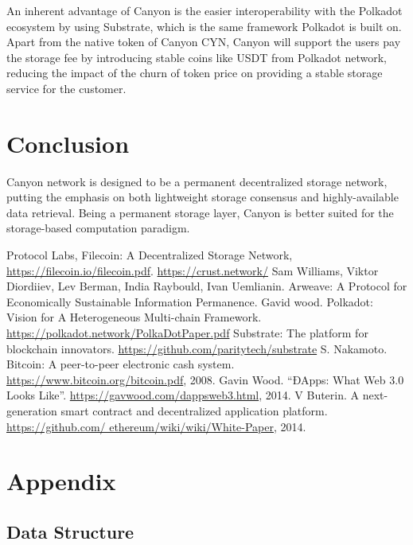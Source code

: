 \documentclass[]{article}
\begin{document}
An inherent advantage of Canyon is the easier interoperability with the Polkadot\cite{ref4} ecosystem by using Substrate\cite{ref5}, which is the same framework Polkadot is built on. Apart from the native token of Canyon CYN, Canyon will support the users pay the storage fee by introducing stable coins like USDT from Polkadot network, reducing the impact of the churn of token price on providing a stable storage service for the customer.

\section{Conclusion}

Canyon network is designed to be a permanent decentralized storage network, putting the emphasis on both lightweight storage consensus and highly-available data retrieval. Being a permanent storage layer, Canyon is better suited for the storage-based computation paradigm.

\begin{thebibliography}{99}
Protocol Labs, Filecoin: A Decentralized Storage Network, \url{https://filecoin.io/filecoin.pdf}.
\url{https://crust.network/}
Sam Williams, Viktor Diordiiev, Lev Berman, India Raybould, Ivan Uemlianin. Arweave: A Protocol for Economically Sustainable Information Permanence.
Gavid wood. Polkadot: Vision for A Heterogeneous Multi-chain Framework. \url{https://polkadot.network/PolkaDotPaper.pdf}
Substrate: The platform for blockchain innovators. \url{https://github.com/paritytech/substrate}
S. Nakamoto. Bitcoin: A peer-to-peer electronic cash system. \url{https://www.bitcoin.org/bitcoin.pdf}, 2008.
Gavin Wood. “ĐApps: What Web 3.0 Looks Like”. \url{https://gavwood.com/dappsweb3.html}, 2014.
V Buterin. A next-generation smart contract and decentralized application platform. \url{https://github.com/
ethereum/wiki/wiki/White-Paper}, 2014.
\end{thebibliography}

\appendix
\section{Appendix}

\subsection{Data Structure}
\end{document}
